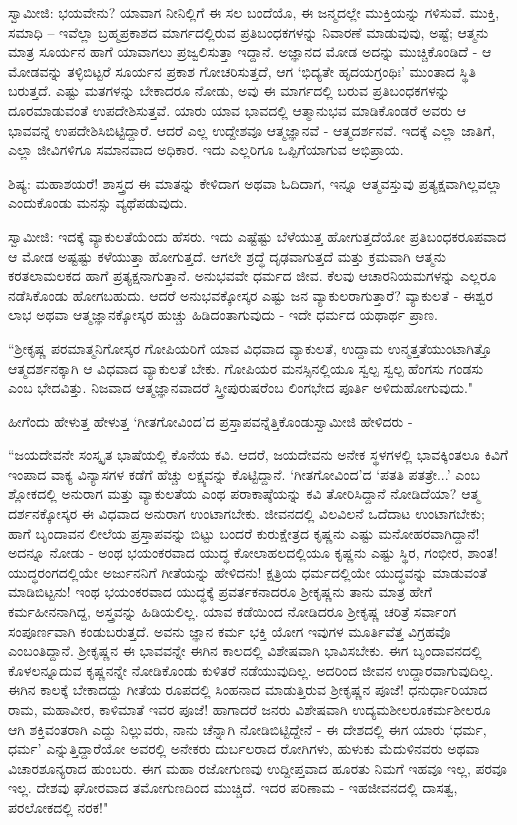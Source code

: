 ಸ್ವಾಮೀಜಿ: ಭಯವೇನು? ಯಾವಾಗ ನೀನಿಲ್ಲಿಗೆ ಈ ಸಲ ಬಂದೆಯೊ, ಈ ಜನ್ಮದಲ್ಲೇ ಮುಕ್ತಿಯನ್ನು ಗಳಿಸುವೆ. ಮುಕ್ತಿ, ಸಮಾಧಿ – ಇವೆಲ್ಲಾ ಬ್ರಹ್ಮಪ್ರಕಾಶದ ಮಾರ್ಗದಲ್ಲಿರುವ ಪ್ರತಿಬಂಧಕಗಳನ್ನು ನಿವಾರಣೆ ಮಾಡುವುವು, ಅಷ್ಟೆ; ಆತ್ಮನು ಮಾತ್ರ ಸೂರ್ಯನ ಹಾಗೆ ಯಾವಾಗಲು ಪ್ರಜ್ವಲಿಸುತ್ತಾ ಇದ್ದಾನೆ. ಅಜ್ಞಾನದ ಮೋಡ ಅದನ್ನು ಮುಚ್ಚಿಕೊಂಡಿದೆ - ಆ ಮೋಡವನ್ನು ತಳ್ಳಿಬಿಟ್ಟರೆ ಸೂರ್ಯನ ಪ್ರಕಾಶ ಗೋಚರಿಸುತ್ತದೆ, ಆಗ ‘ಭಿದ್ಯತೇ ಹೃದಯಗ್ರಂಥಿಃ’ ಮುಂತಾದ ಸ್ಥಿತಿ ಬರುತ್ತದೆ. ಎಷ್ಟು ಮತಗಳನ್ನು ಬೇಕಾದರೂ ನೋಡು, ಅವು ಈ ಮಾರ್ಗದಲ್ಲಿ ಬರುವ ಪ್ರತಿಬಂಧಕಗಳನ್ನು ದೂರಮಾಡುವಂತೆ ಉಪದೇಶಿಸುತ್ತವೆ. ಯಾರು ಯಾವ ಭಾವದಲ್ಲಿ ಆತ್ಮಾನುಭವ ಮಾಡಿಕೊಂಡರೆ ಅವರು ಆ ಭಾವವನ್ನೆ ಉಪದೇಶಿಸಿಬಿಟ್ಟಿದ್ದಾರೆ. ಆದರೆ ಎಲ್ಲ ಉದ್ದೇಶವೂ ಆತ್ಮಜ್ಞಾನವೆ - ಆತ್ಮದರ್ಶನವೆ. ಇದಕ್ಕೆ ಎಲ್ಲಾ ಜಾತಿಗೆ, ಎಲ್ಲಾ ಜೀವಿಗಳಿಗೂ ಸಮಾನವಾದ ಅಧಿಕಾರ. ಇದು ಎಲ್ಲರಿಗೂ ಒಪ್ಪಿಗೆಯಾಗುವ ಅಭಿಪ್ರಾಯ.

ಶಿಷ್ಯ: ಮಹಾಶಯರೆ! ಶಾಸ್ತ್ರದ ಈ ಮಾತನ್ನು ಕೇಳಿದಾಗ ಅಥವಾ ಓದಿದಾಗ, ಇನ್ನೂ ಆತ್ಮವಸ್ತುವು ಪ್ರತ್ಯಕ್ಷವಾಗಿಲ್ಲವಲ್ಲಾ ಎಂದುಕೊಂಡು ಮನಸ್ಸು ವ್ಯಥೆಪಡುವುದು.

\newpage

ಸ್ವಾಮೀಜಿ: ಇದಕ್ಕೆ ವ್ಯಾಕುಲತೆಯೆಂದು ಹೆಸರು. ಇದು ಎಷ್ಟೆಷ್ಟು ಬೆಳೆಯುತ್ತ ಹೋಗುತ್ತದೆಯೋ ಪ್ರತಿಬಂಧಕರೂಪವಾದ ಆ ಮೋಡ ಅಷ್ಟಷ್ಟು ಕಳೆಯುತ್ತಾ ಹೋಗುತ್ತದೆ. ಆಗಲೇ ಶ್ರದ್ಧೆ ದೃಢವಾಗುತ್ತದೆ ಮತ್ತು ಕ್ರಮವಾಗಿ ಆತ್ಮನು ಕರತಲಾಮಲಕದ ಹಾಗೆ ಪ್ರತ್ಯಕ್ಷನಾಗುತ್ತಾನೆ. ಅನುಭವವೇ ಧರ್ಮದ ಜೀವ. ಕೆಲವು ಆಚಾರನಿಯಮಗಳನ್ನು ಎಲ್ಲರೂ ನಡೆಸಿಕೊಂಡು ಹೋಗಬಹುದು. ಆದರೆ ಅನುಭವಕ್ಕೋಸ್ಕರ ಎಷ್ಟು ಜನ ವ್ಯಾಕುಲರಾಗುತ್ತಾರೆ? ವ್ಯಾಕುಲತೆ - ಈಶ್ವರ ಲಾಭ ಅಥವಾ ಆತ್ಮಜ್ಞಾನಕ್ಕೋಸ್ಕರ ಹುಚ್ಚು ಹಿಡಿದಂತಾಗುವುದು - ಇದೇ ಧರ್ಮದ ಯಥಾರ್ಥ ಪ್ರಾಣ.

“ಶ‍್ರೀಕೃಷ್ಣ ಪರಮಾತ್ಮನಿಗೋಸ್ಕರ ಗೋಪಿಯರಿಗೆ ಯಾವ ವಿಧವಾದ ವ್ಯಾಕುಲತೆ, ಉದ್ದಾಮ ಉನ್ಮತ್ತತೆಯುಂಟಾಗಿತ್ತೊ ಆತ್ಮದರ್ಶನಕ್ಕಾಗಿ ಆ ವಿಧವಾದ ವ್ಯಾಕುಲತೆ ಬೇಕು. ಗೋಪಿಯರ ಮನಸ್ಸಿನಲ್ಲಿಯೂ ಸ್ವಲ್ಪ ಸ್ವಲ್ಪ ಹೆಂಗಸು ಗಂಡಸು ಎಂಬ ಭೇದವಿತ್ತು. ನಿಜವಾದ ಆತ್ಮಜ್ಞಾನವಾದರೆ ಸ್ತ್ರೀಪುರುಷರೆಂಬ ಲಿಂಗಭೇದ ಪೂರ್ತಿ ಅಳಿದುಹೋಗುವುದು."

ಹೀಗೆಂದು ಹೇಳುತ್ತ ಹೇಳುತ್ತ ‘ಗೀತಗೋವಿಂದ’ದ ಪ್ರಸ್ತಾಪವನ್ನೆತ್ತಿಕೊಂಡು\break ಸ್ವಾಮೀಜಿ ಹೇಳಿದರು -

“ಜಯದೇವನೇ ಸಂಸ್ಕೃತ ಭಾಷೆಯಲ್ಲಿ ಕೊನೆಯ ಕವಿ. ಆದರೆ, ಜಯದೇವನು ಅನೇಕ ಸ್ಥಳಗಳಲ್ಲಿ ಭಾವಕ್ಕಿಂತಲೂ ಕಿವಿಗೆ ಇಂಪಾದ ವಾಕ್ಯ ವಿನ್ಯಾಸಗಳ ಕಡೆಗೆ ಹೆಚ್ಚು ಲಕ್ಷ್ಯವನ್ನು ಕೊಟ್ಟಿದ್ದಾನೆ. ‘ಗೀತಗೋವಿಂದ’ದ ‘ಪತತಿ ಪತತ್ರೇ...’ ಎಂಬ ಶ್ಲೋಕದಲ್ಲಿ ಅನುರಾಗ ಮತ್ತು ವ್ಯಾಕುಲತೆಯ ಎಂಥ ಪರಾಕಾಷ್ಠೆಯನ್ನು ಕವಿ ತೋರಿಸಿದ್ದಾನೆ ನೋಡಿದೆಯಾ? ಆತ್ಮ ದರ್ಶನಕ್ಕೋಸ್ಕರ ಈ ವಿಧವಾದ ಅನುರಾಗ ಉಂಟಾಗಬೇಕು. ಜೀವನದಲ್ಲಿ ವಿಲವಿಲನೆ ಒದೆದಾಟ ಉಂಟಾಗಬೇಕು; ಹಾಗೆ ಬೃಂದಾವನ ಲೀಲೆಯ ಪ್ರಸ್ತಾಪವನ್ನು ಬಿಟ್ಟು ಬಂದರೆ ಕುರುಕ್ಷೇತ್ರದ ಕೃಷ್ಣನು ಎಷ್ಟು ಮನೋಹರವಾಗಿದ್ದಾನೆ! ಅದನ್ನೂ ನೋಡು - ಅಂಥ ಭಯಂಕರವಾದ ಯುದ್ಧ ಕೋಲಾಹಲದಲ್ಲಿಯೂ ಕೃಷ್ಣನು ಎಷ್ಟು ಸ್ಥಿರ, ಗಂಭೀರ, ಶಾಂತ! ಯುದ್ಧರಂಗದಲ್ಲಿಯೇ ಅರ್ಜುನನಿಗೆ ಗೀತೆಯನ್ನು ಹೇಳಿದನು! ಕ್ಷತ್ರಿಯ ಧರ್ಮದಲ್ಲಿಯೇ ಯುದ್ಧವನ್ನು ಮಾಡುವಂತೆ ಮಾಡಿಬಿಟ್ಟನು! ಇಂಥ ಭಯಂಕರವಾದ ಯುದ್ಧಕ್ಕೆ ಪ್ರವರ್ತಕನಾದರೂ ಶ‍್ರೀಕೃಷ್ಣನು ತಾನು ಮಾತ್ರ ಹೇಗೆ ಕರ್ಮಹೀನನಾಗಿದ್ದ, ಅಸ್ತ್ರವನ್ನು ಹಿಡಿಯಲಿಲ್ಲ. ಯಾವ ಕಡೆಯಿಂದ ನೋಡಿದರೂ ಶ‍್ರೀಕೃಷ್ಣ ಚರಿತ್ರೆ ಸರ್ವಾಂಗ ಸಂಪೂರ್ಣವಾಗಿ ಕಂಡುಬರುತ್ತದೆ. ಅವನು ಜ್ಞಾನ ಕರ್ಮ ಭಕ್ತಿ ಯೋಗ ಇವುಗಳ ಮೂರ್ತಿವೆತ್ತ ವಿಗ್ರಹವೊ ಎಂಬಂತಿದ್ದಾನೆ. ಶ‍್ರೀಕೃಷ್ಣನ ಈ ಭಾವವನ್ನೇ ಈಗಿನ ಕಾಲದಲ್ಲಿ ವಿಶೇಷವಾಗಿ ಭಾವಿಸಬೇಕು. ಈಗ ಬೃಂದಾವನದಲ್ಲಿ ಕೊಳಲನ್ನೂದುವ ಕೃಷ್ಣನನ್ನೇ ನೋಡಿಕೊಂಡು ಕುಳಿತರೆ ನಡೆಯುವುದಿಲ್ಲ. ಅದರಿಂದ ಜೀವನ ಉದ್ದಾರವಾಗುವುದಿಲ್ಲ. ಈಗಿನ ಕಾಲಕ್ಕೆ ಬೇಕಾದದ್ದು ಗೀತೆಯ ರೂಪದಲ್ಲಿ ಸಿಂಹನಾದ ಮಾಡುತ್ತಿರುವ ಶ‍್ರೀಕೃಷ್ಣನ ಪೂಜೆ! ಧನುರ್ಧಾರಿಯಾದ ರಾಮ, ಮಹಾವೀರ, ಕಾಳಿಮಾತೆ ಇವರ ಪೂಜೆ! ಹಾಗಾದರೆ ಜನರು ವಿಶೇಷವಾಗಿ ಉದ್ಯಮಶೀಲರೂ\break ಕರ್ಮಶೀಲರೂ ಆಗಿ ಶಕ್ತಿವಂತರಾಗಿ ಎದ್ದು ನಿಲ್ಲುವರು, ನಾನು ಚೆನ್ನಾಗಿ ನೋಡಿಬಿಟ್ಟಿದ್ದೇನೆ - ಈ ದೇಶದಲ್ಲಿ ಈಗ ಯಾರು ‘ಧರ್ಮ, ಧರ್ಮ’ ಎನ್ನುತ್ತಿದ್ದಾರೆಯೋ ಅವರಲ್ಲಿ ಅನೇಕರು ದುರ್ಬಲರಾದ ರೋಗಿಗಳು, ಹುಳುಕು ಮೆದುಳಿನವರು ಅಥವಾ ವಿಚಾರಶೂನ್ಯರಾದ ಹುಂಬರು. ಈಗ ಮಹಾ ರಜೋಗುಣವು ಉದ್ದೀಪ್ತವಾದ ಹೂರತು ನಿಮಗೆ ಇಹವೂ ಇಲ್ಲ, ಪರವೂ ಇಲ್ಲ. ದೇಶವು ಘೋರವಾದ ತಮೋಗುಣದಿಂದ ಮುಚ್ಚಿದೆ. ಇದರ ಪರಿಣಾಮ - ಇಹಜೀವನದಲ್ಲಿ ದಾಸತ್ವ, ಪರಲೋಕದಲ್ಲಿ ನರಕ!"

